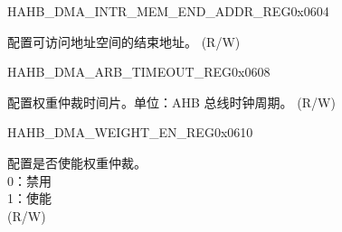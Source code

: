 \begin{register}{H}{AHB\_DMA\_INTR\_MEM\_END\_ADDR\_REG}{0x0604}\label{regdesc:AHBDMAINTRMEMENDADDRREG}
%
\regnewline%
\begin{regdesc}\begin{reglist}
\label{fielddesc:AHBDMAACCESSINTRMEMENDADDR}\item [AHB\_DMA\_ACCESS\_INTR\_MEM\_END\_ADDR] 配置可访问地址空间的结束地址。 (R/W)
\end{reglist}\end{regdesc}
\end{register}


\begin{register}{H}{AHB\_DMA\_ARB\_TIMEOUT\_REG}{0x0608}\label{regdesc:AHBDMAARBTIMEOUTREG}
%
%
\regnewline%
\begin{regdesc}\begin{reglist}
\label{fielddesc:AHBDMAARBTIMEOUT}\item [AHB\_DMA\_ARB\_TIMEOUT] 配置权重仲裁时间片。单位：AHB 总线时钟周期。 (R/W)
\end{reglist}\end{regdesc}
\end{register}


\begin{register}{H}{AHB\_DMA\_WEIGHT\_EN\_REG}{0x0610}\label{regdesc:AHBDMAWEIGHTENREG}
%
%
\regnewline%
\begin{regdesc}\begin{reglist}
\label{fielddesc:AHBDMAWEIGHTEN}\item [AHB\_DMA\_WEIGHT\_EN] 配置是否使能权重仲裁。\\0：禁用\\1：使能\\ (R/W)
\end{reglist}\end{regdesc}
\end{register}


